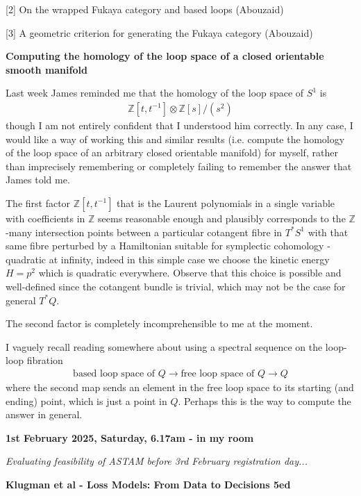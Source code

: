 \documentclass[hidelinks, 12pt]{article}
\theoremstyle{mydefstyle}
\theoremstyle{mythmstyle}
\begin{document}
[2] On the wrapped Fukaya category and based loops (Abouzaid)

[3] A geometric criterion for generating the Fukaya category (Abouzaid)

\textbf{Computing the homology of the loop space of a closed orientable smooth manifold}

Last week James reminded me that the homology of the loop space of $S^1$ is
\begin{gather*}
\mathbb{Z}[t, t^{-1}] \otimes \mathbb{Z}[s]/(s^2)
\end{gather*}
though I am not entirely confident that I understood him correctly. In any case, I would like a way of working this and similar results (i.e. compute the homology of the loop space of an arbitrary closed orientable manifold) for myself, rather than imprecisely remembering or completely failing to remember the answer that James told me.

The first factor $\mathbb{Z}[t, t^{-1}]$ that is the Laurent polynomials in a single variable with coefficients in $\mathbb{Z}$ seems reasonable enough and plausibly corresponds to the $\mathbb{Z}$-many intersection points between a particular cotangent fibre in $T^*S^1$ with that same fibre perturbed by a Hamiltonian suitable for symplectic cohomology - quadratic at infinity, indeed in this simple case we choose the kinetic energy $H = p^2$ which is quadratic everywhere. Observe that this choice is possible and well-defined since the cotangent bundle is trivial, which may not be the case for general $T^*Q$. 

The second factor is completely incomprehensible to me at the moment. 

I vaguely recall reading somewhere about using a spectral sequence on the loop-loop fibration
\begin{gather*}
\mbox{based loop space of $Q$} \longrightarrow \mbox{free loop space of $Q$} \longrightarrow Q
\end{gather*}
where the second map sends an element in the free loop space to its starting (and ending) point, which is just a point in $Q$. Perhaps this is the way to compute the answer in general. 

\newpage

\textbf{1st February 2025, Saturday, 6.17am - in my room}

\emph{Evaluating feasibility of ASTAM before 3rd February registration day...}

\textbf{Klugman et al - Loss Models: From Data to Decisions 5ed}
\end{document}

